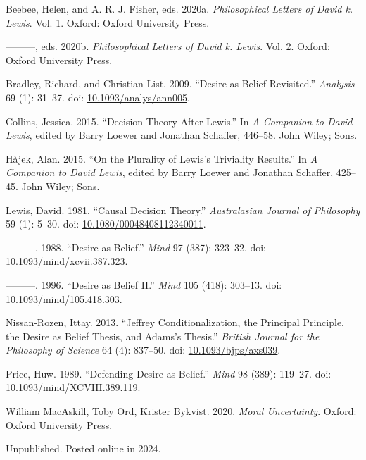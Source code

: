 \documentclass[
  10pt,
  letterpaper,
  DIV=11,
  numbers=noendperiod,
  twoside]{scrartcl}
\newlength{\cslhangindent}
\newenvironment{CSLReferences}[2] %
 {\begin{list}{}{%
  \setlength{\itemindent}{0pt}
  \setlength{\leftmargin}{0pt}
  \setlength{\parsep}{0pt}
  \ifodd #1
   \setlength{\leftmargin}{\cslhangindent}
   \setlength{\itemindent}{-1\cslhangindent}
  \fi
  \setlength{\itemsep}{#2\baselineskip}}}
 {\end{list}}
\begin{document}
\label{refs}
\begin{CSLReferences}{1}{0}
Beebee, Helen, and A. R. J. Fisher, eds. 2020a. \emph{Philosophical
Letters of David k. Lewis}. Vol. 1. Oxford: Oxford University Press.

---------, eds. 2020b. \emph{Philosophical Letters of David k. Lewis}.
Vol. 2. Oxford: Oxford University Press.

Bradley, Richard, and Christian List. 2009. {``Desire-as-Belief
Revisited.''} \emph{Analysis} 69 (1): 31--37. doi:
\href{https://doi.org/10.1093/analys/ann005}{10.1093/analys/ann005}.

Collins, Jessica. 2015. {``Decision Theory After Lewis.''} In \emph{A
Companion to David Lewis}, edited by Barry Loewer and Jonathan Schaffer,
446--58. John Wiley; Sons.

Hàjek, Alan. 2015. {``On the Plurality of Lewis's Triviality Results.''}
In \emph{A Companion to David Lewis}, edited by Barry Loewer and
Jonathan Schaffer, 425--45. John Wiley; Sons.

Lewis, David. 1981. {``Causal Decision Theory.''} \emph{Australasian
Journal of Philosophy} 59 (1): 5--30. doi:
\href{https://doi.org/10.1080/00048408112340011}{10.1080/00048408112340011}.

---------. 1988. {``Desire as Belief.''} \emph{Mind} 97 (387): 323--32.
doi:
\href{https://doi.org/10.1093/mind/xcvii.387.323}{10.1093/mind/xcvii.387.323}.

---------. 1996. {``Desire as Belief {II}.''} \emph{Mind} 105 (418):
303--13. doi:
\href{https://doi.org/10.1093/mind/105.418.303}{10.1093/mind/105.418.303}.

Nissan-Rozen, Ittay. 2013. {``Jeffrey Conditionalization, the Principal
Principle, the Desire as Belief Thesis, and Adams's Thesis.''}
\emph{British Journal for the Philosophy of Science} 64 (4): 837--50.
doi: \href{https://doi.org/10.1093/bjps/axs039}{10.1093/bjps/axs039}.

Price, Huw. 1989. {``Defending Desire-as-Belief.''} \emph{Mind} 98
(389): 119--27. doi:
\href{https://doi.org/10.1093/mind/XCVIII.389.119}{10.1093/mind/XCVIII.389.119}.

William MacAskill, Toby Ord, Krister Bykvist. 2020. \emph{Moral
Uncertainty}. Oxford: {O}xford {U}niversity {P}ress.

\end{CSLReferences}



\noindent Unpublished. Posted online in 2024.
\end{document}
